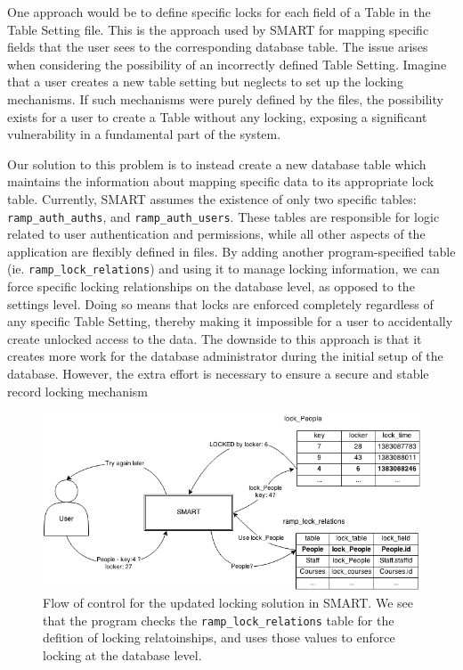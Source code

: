 \documentclass[12pt]{article}
\newcommand{\code}[1]{\texttt{#1}}
\begin{document}
One approach would be to define specific locks for each field of a Table in the Table Setting file. This is the approach used by SMART for mapping specific fields that the user sees to the corresponding database table. The issue arises when considering the possibility of an incorrectly defined Table Setting. Imagine that a user creates a new table setting but neglects to set up the locking mechanisms. If such mechanisms were purely defined by the files, the possibility exists for a user to create a Table without any locking, exposing a significant vulnerability in a fundamental part of the system.

Our solution to this problem is to instead create a new database table which maintains the information about mapping specific data to its appropriate lock table. Currently, SMART assumes the existence of only two specific tables: \code{ramp\_auth\_auths}, and \code{ramp\_auth\_users}. These tables are responsible for logic related to user authentication and permissions, while all other aspects of the application are flexibly defined in files. By adding another program-specified table (ie. \code{ramp\_lock\_relations}) and using it to manage locking information, we can force specific locking relationships on the database level, as opposed to the settings level. Doing so means that locks are enforced completely regardless of any specific Table Setting, thereby making it impossible for a user to accidentally create unlocked access to the data. The downside to this approach is that it creates more work for the database administrator during the initial setup of the database. However, the extra effort is necessary to ensure a secure and stable record locking mechanism

\newpage

\begin{center}
\begin{figure}[h]
    \vspace{-10pt}
    \centering
    \centerline{\includegraphics[width=6.5in]{diagrams/SecondLockDesign.png}}
    \begin{spacing}{1.0}\caption{Flow of control for the updated locking solution in SMART. We see that the program checks the \code{ramp\_lock\_relations} table for the defition of locking relatoinships, and uses those values to enforce locking at the database level.}\end{spacing}
    \vspace{-20pt}
\end{figure}
\end{center}
\end{document}
